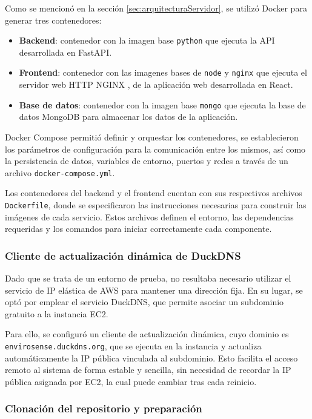 Como se mencionó en la sección \ref{sec:arquitecturaServidor}, se utilizó
Docker para generar tres contenedores:

\begin{itemize}
    \item \textbf{Backend}: contenedor con la imagen base \texttt{python}
          que ejecuta la API desarrollada en FastAPI.
    \item \textbf{Frontend}: contenedor con las imagenes bases de \texttt{node}
          y \texttt{nginx} que ejecuta el servidor web HTTP NGINX
          \cite{NGINX}, de la aplicación web desarrollada en React.
    \item \textbf{Base de datos}: contenedor con la imagen base \texttt{mongo}
          que ejecuta la base de datos MongoDB para almacenar los datos de la aplicación.
\end{itemize}

Docker Compose permitió definir y orquestar los contenedores, se establecieron
los parámetros de configuración para la comunicación entre los mismos, así como
la persistencia de datos, variables de entorno, puertos y redes a través de un
archivo \texttt{docker-compose.yml}.

Los contenedores del backend y el frontend cuentan con sus respectivos archivos
\texttt{Dockerfile}, donde se especificaron las instrucciones necesarias para
construir las imágenes de cada servicio. Estos archivos definen el entorno, las
dependencias requeridas y los comandos para iniciar correctamente cada
componente.

\subsubsection{Cliente de actualización dinámica de DuckDNS}

Dado que se trata de un entorno de prueba, no resultaba necesario utilizar el
servicio de IP elástica de AWS para mantener una dirección fija. En su lugar,
se optó por emplear el servicio DuckDNS, que permite asociar un subdominio
gratuito a la instancia EC2.

Para ello, se configuró un cliente de actualización dinámica, cuyo dominio es
\texttt{envirosense.duckdns.org}, que se ejecuta en la instancia y actualiza
automáticamente la IP pública vinculada al subdominio. Esto facilita el acceso
remoto al sistema de forma estable y sencilla, sin necesidad de recordar la IP
pública asignada por EC2, la cual puede cambiar tras cada reinicio.

\subsubsection{Clonación del repositorio y preparación}

